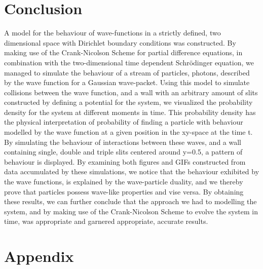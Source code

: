 \documentclass[10pt, nofootinbib, twocolumn]{revtex4-1}
\begin{document}
\section{Conclusion}\label{sec:conclusion}

A model for the behaviour of wave-functions in a strictly defined, two dimensional space with Dirichlet boundary conditions was constructed. By making use of the Crank-Nicolson Scheme for partial difference equations, in combination with the two-dimensional time dependent Schrödinger equation, we managed to simulate the behaviour of a stream of particles, photons, described by the wave function for a Gaussian wave-packet. Using this model to simulate collisions between the wave function, and a wall with an arbitrary amount of slits constructed by defining a potential for the system, we visualized the probability density for the system at different moments in time. This probability density has the physical interpretation of probability of finding a particle with behaviour modelled by the wave function at a given position in the xy-space at the time t. \\

By simulating the behaviour of interactions between these waves, and a wall containing single, double and triple slits centered around y=0.5, a pattern of behaviour is displayed. By examining both figures and GIFs constructed from data accumulated by these simulations, we notice that the behaviour exhibited by the wave functions, is explained by the wave-particle duality, and we thereby prove that particles possess wave-like properties and vise versa. By obtaining these results, we can further conclude that the approach we had to modelling the system, and by making use of the Crank-Nicolson Scheme to evolve the system in time, was appropriate and garnered appropriate, accurate results. 



{}




\cleardoublepage
\section{Appendix}\label{sec:appendix}
\end{document}
